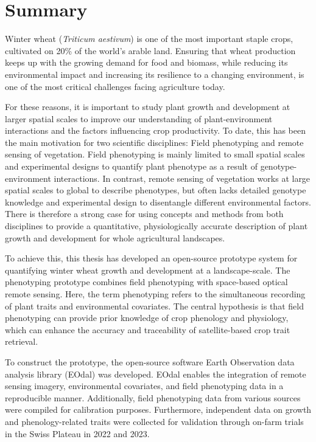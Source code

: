 \chapter*{Summary}

Winter wheat (\textsl{Triticum aestivum}) is one of the most important staple crops, cultivated on 20\% of the world's arable land. Ensuring that wheat production keeps up with the growing demand for food and biomass, while reducing its environmental impact and increasing its resilience to a changing environment, is one of the most critical challenges facing agriculture today.

For these reasons, it is important to study plant growth and development at larger spatial scales to improve our understanding of plant-environment interactions and the factors influencing crop productivity. To date, this has been the main motivation for two scientific disciplines: Field phenotyping and remote sensing of vegetation. Field phenotyping is mainly limited to small spatial scales and experimental designs to quantify plant phenotype as a result of genotype-environment interactions. In contrast, remote sensing of vegetation works at large spatial scales to global to describe phenotypes, but often lacks detailed genotype knowledge and experimental design to disentangle different environmental factors. There is therefore a strong case for using concepts and methods from both disciplines to provide a quantitative, physiologically accurate description of plant growth and development for whole agricultural landscapes.

To achieve this, this thesis has developed an open-source prototype system for quantifying winter wheat growth and development at a landscape-scale. The phenotyping prototype combines field phenotyping with space-based optical remote sensing. Here, the term phenotyping refers to the simultaneous recording of plant traits and environmental covariates. The central hypothesis is that field phenotyping can provide prior knowledge of crop phenology and physiology, which can enhance the accuracy and traceability of satellite-based crop trait retrieval.

To construct the prototype, the open-source software Earth Observation data analysis library (EOdal) was developed. EOdal enables the integration of remote sensing imagery, environmental covariates, and field phenotyping data in a reproducible manner. Additionally, field phenotyping data from various sources were compiled for calibration purposes. Furthermore, independent data on growth and phenology-related traits were collected for validation through on-farm trials in the Swiss Plateau in 2022 and 2023.

